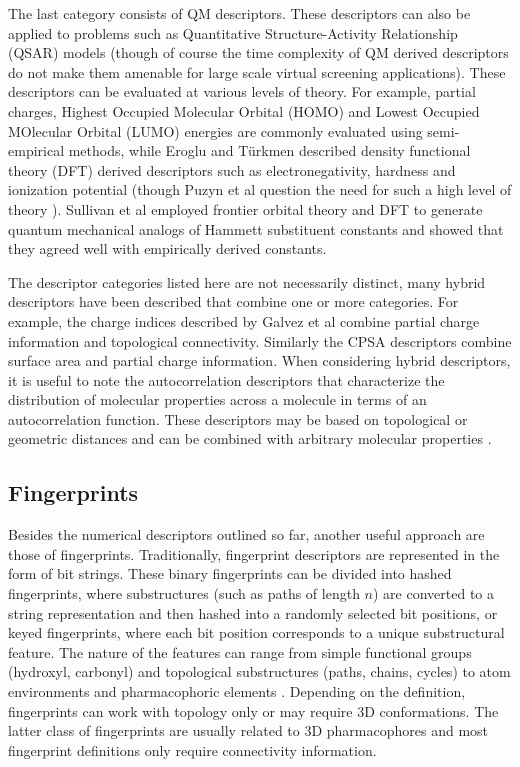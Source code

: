 \documentclass[letterpaper, 12pt]{article}
\begin{document}
The last category consists of QM descriptors. These descriptors can
also be applied to problems such as Quantitative Structure-Activity
Relationship (QSAR) models (though of course the
time complexity of QM derived descriptors do not make them amenable
for large scale virtual screening applications). These descriptors can
be evaluated at various levels of theory. For example, partial
charges, Highest Occupied Molecular Orbital (HOMO) and Lowest Occupied
MOlecular Orbital (LUMO) energies are commonly evaluated using
semi-empirical methods, while Eroglu and T\"{u}rkmen
\cite{Eroglu:2007uq} described density functional theory (DFT) derived
descriptors such as electronegativity, hardness and ionization
potential (though Puzyn et al question the need for such a high level
of theory \cite{Puzyn:2008fk}). Sullivan et al \cite{Sullivan:2000fk}
employed frontier orbital theory and DFT to generate quantum
mechanical analogs of Hammett substituent constants
\cite{Hammett:1937aa} and showed that they agreed well with
empirically derived constants.

The descriptor categories listed here are not necessarily distinct,
many hybrid descriptors have been described that combine one or more
categories. For example, the charge indices described by Galvez et al
\cite{Galvez:1994aa} combine partial charge information and
topological connectivity. Similarly the CPSA descriptors combine
surface area and partial charge information. When considering hybrid
descriptors, it is useful to note the autocorrelation descriptors that
characterize the distribution of molecular properties across a
molecule in terms of an autocorrelation function. These descriptors
may be based on topological or geometric distances and can be combined
with arbitrary molecular properties \cite{Moreau:1980aa,Broto:1984aa}.

\subsection{Fingerprints}

Besides the numerical descriptors outlined so far, another useful
approach are those of fingerprints. Traditionally, fingerprint descriptors are
represented in the form of bit strings. These binary fingerprints can be
divided into hashed fingerprints, where substructures (such as paths
of length $n$) are converted to a string representation and then
hashed into a randomly selected bit positions, or keyed fingerprints,
where each bit position corresponds to a unique substructural
feature. The nature of the features can range from simple functional
groups (hydroxyl, carbonyl) and topological substructures (paths,
chains, cycles) to atom environments \cite{Bremser1978,Bender:2004aa}
and pharmacophoric elements \cite{Renner:2006aa}. Depending on the
definition, fingerprints can work with topology only or may require 3D
conformations. The latter class of fingerprints are usually related to
3D pharmacophores and most fingerprint definitions only require
connectivity information. 
\end{document}
